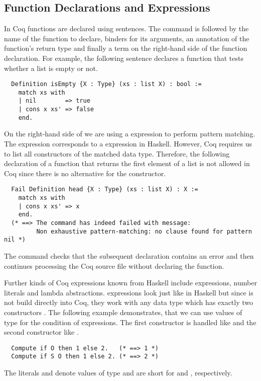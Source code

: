 \subsection{Function Declarations and Expressions} \label{sec:preliminaries:coq:func-decls}
In Coq functions are declared using  sentences.
The  command is followed by the name of the function to declare, binders for its arguments, an annotation of the function's return type and finally a term on the right-hand side of the function declaration.
For example, the following  sentence declares a function  that tests whether a list  is empty or not.
\begin{verbatim}
  Definition isEmpty {X : Type} (xs : list X) : bool :=
    match xs with
    | nil        => true
    | cons x xs' => false
    end.
\end{verbatim}
On the right-hand side of  we are using a  expression to perform pattern matching.
The  expression corresponds to a  expression in Haskell.
However, Coq requires us to list all constructors of the matched data type.
Therefore, the following declaration of a function that returns the first element of a list is not allowed in Coq since there is no alternative for the  constructor.
\begin{verbatim}
  Fail Definition head {X : Type} (xs : list X) : X :=
    match xs with
    | cons x xs' => x
    end.
  (* ==> The command has indeed failed with message:
         Non exhaustive pattern-matching: no clause found for pattern nil *)
\end{verbatim}
The  command checks that the subsequent declaration contains an error and then continues processing the Coq source file without declaring the function.

Further kinds of Coq expressions known from Haskell include  expressions, number literals and lambda abstractions.
 expressions look just like in Haskell but since  is not build directly into Coq, they work with any data type which has exactly two constructors \cite[p.~48]{CoqDevTeam:2018}.
The following example demonstrates, that we can use values of type  for the condition of  expressions.
The first constructor  is handled like  and the second constructor  like .
\begin{verbatim}
  Compute if O then 1 else 2.   (* ==> 1 *)
  Compute if S O then 1 else 2. (* ==> 2 *)
\end{verbatim}
The literals  and  denote values of type  and are short for  and , respectively.

